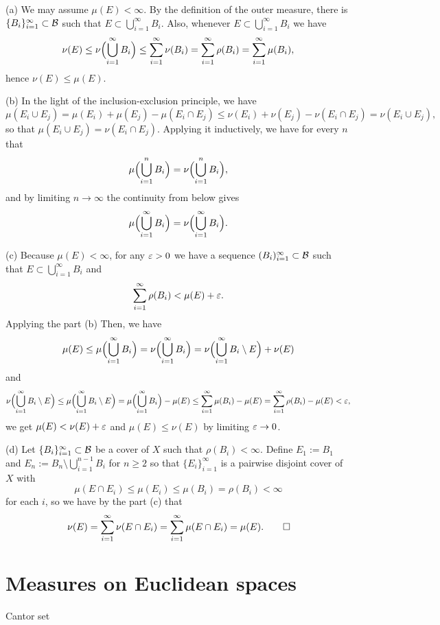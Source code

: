 \documentclass{../../large}
\begin{document}
\begin{pf}
(a)
We may assume $\mu(E)<\infty$.
By the definition of the outer measure, there is $\{B_i\}_{i=1}^\infty\subset\mathcal{B}$ such that $E\subset\bigcup_{i=1}^\infty B_i$.
Also, whenever $E\subset\bigcup_{i=1}^\infty B_i$ we have
\[\nu(E)\le\nu\Bigl(\bigcup_{i=1}^\infty B_i\Bigr)\le\sum_{i=1}^\infty\nu(B_i)=\sum_{i=1}^\infty\rho(B_i)=\sum_{i=1}^\infty\mu(B_i),\]
hence $\nu(E)\le\mu(E)$.

(b)
In the light of the inclusion-exclusion principle, we have
\[\mu(E_i\cup E_j)=\mu(E_i)+\mu(E_j)-\mu(E_i\cap E_j)\le\nu(E_i)+\nu(E_j)-\nu(E_i\cap E_j)=\nu(E_i\cup E_j),\]
so that $\mu(E_i\cup E_j)=\nu(E_i\cap E_j)$.
Applying it inductively, we have for every $n$ that
\[\mu\Bigl(\bigcup_{i=1}^nB_i\Bigr)=\nu\Bigl(\bigcup_{i=1}^nB_i\Bigr),\]
and by limiting $n\to\infty$ the continuity from below gives
\[\mu\Bigl(\bigcup_{i=1}^\infty B_i\Bigr)=\nu\Bigl(\bigcup_{i=1}^\infty B_i\Bigr).\]

(c)
Because $\mu(E)<\infty$, for any $\varepsilon>0$ we have a sequence $(B_i)_{i=1}^\infty\subset\mathcal{B}$ such that $E\subset\bigcup_{i=1}^\infty B_i$ and
\[\sum_{i=1}^\infty\rho(B_i)<\mu(E)+\varepsilon.\]
Applying the part (b) 
Then, we have
\[\mu(E)\le\mu\Bigl(\bigcup_{i=1}^\infty B_i\Bigr)=\nu\Bigl(\bigcup_{i=1}^\infty B_i\Bigr)=\nu\Bigl(\bigcup_{i=1}^\infty B_i\setminus E\Bigr)+\nu(E)\]
and
\[\nu\Bigl(\bigcup_{i=1}^\infty B_i\setminus E\Bigr)
\le\mu\Bigl(\bigcup_{i=1}^\infty B_i\setminus E\Bigr)
=\mu\Bigl(\bigcup_{i=1}^\infty B_i\Bigr)-\mu(E)
\le\sum_{i=1}^\infty\mu(B_i)-\mu(E)=\sum_{i=1}^\infty\rho(B_i)-\mu(E)<\varepsilon,\]
we get $\mu(E)<\nu(E)+\varepsilon$ and $\mu(E)\le\nu(E)$ by limiting $\varepsilon\to0$.

(d)
Let $\{B_i\}_{i=1}^\infty\subset\mathcal{B}$ be a cover of $X$ such that $\rho(B_i)<\infty$.
Define $E_1:=B_1$ and $E_n:=B_n\setminus\bigcup_{i=1}^{n-1}B_i$ for $n\ge2$ so that $\{E_i\}_{i=1}^\infty$ is a pairwise disjoint cover of $X$ with
\[\mu(E\cap E_i)\le\mu(E_i)\le\mu(B_i)=\rho(B_i)<\infty\]
for each $i$, so we have by the part (c) that
\[\nu(E)=\sum_{i=1}^\infty\nu(E\cap E_i)=\sum_{i=1}^\infty\mu(E\cap E_i)=\mu(E).\qedhere\]
\end{pf}



\section{Measures on Euclidean spaces}

Cantor set

\begin{prb}
\end{prb}
\end{document}

